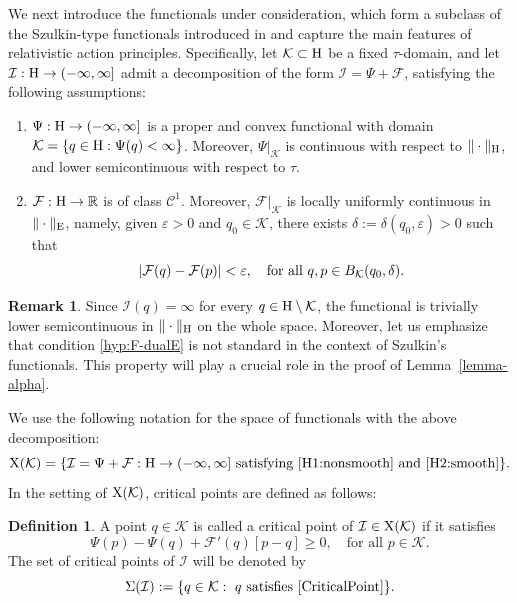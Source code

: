 \documentclass{article}
\newcommand{\boK}{\mathcal{K}}
\newcommand{\boI}{\mathcal{I}}
\newcommand{\R}{\mathbb{R}}
\newcommand{\boF}{\mathcal{F}}
\newcommand{\Hilb}{{\textnormal H}}
\newcommand{\X}{{\textnormal X}}
\theoremstyle{definition}
\newtheorem{remark}{Remark}[section]
\newtheorem{definition}{Definition}[section]
\begin{document}
          
We next introduce the functionals under consideration, which form a subclass of the Szulkin-type functionals introduced in \cite{Szu} and capture the main features of relativistic action principles. Specifically, let $\boK\subset \Hilb$ be a fixed $\tau$-domain, and let $\boI: \Hilb\to (-\infty,\infty]$ admit a decomposition of the form $\boI=\Psi+\boF$, satisfying the following assumptions:
	\begin{enumerate}[label=(H\arabic*)]   
		\item $\Psi:\Hilb\to (-\infty,\infty]$ is a proper and convex functional with domain $\boK=\{q\in\Hilb:\Psi(q)<\infty\}$. Moreover, $\Psi|_{\boK}$ is continuous with respect to $\|\cdot\|_\Hilb$, and lower semicontinuous with respect to $\tau$. \label{H1:nonsmooth}
		\item $\boF:\Hilb\to\R$ is of class $\mathcal{C}^1$. Moreover, $\boF|_\boK$ is locally uniformly continuous in ${\|\cdot\|_\textnormal E}$, namely, given $\varepsilon>0$ and $q_0\in\boK$, there exists $\delta:=\delta(q_0,\varepsilon)>0$ such that\begin{equation}\label{hyp:F-dualE}
		|\boF(q)-\boF(p)|<\varepsilon,\quad\hbox{for all }q,p\in B_\boK(q_0,\delta).\end{equation}\label{H2:smooth} 
\end{enumerate}
\begin{remark}
Since $\boI(q)=\infty$ for every $q\in\Hilb\setminus\boK$, the functional is trivially lower semicontinuous in $\|\cdot\|_\Hilb$ on the whole space. Moreover, let us emphasize that condition \eqref{hyp:F-dualE} is not standard in the context of Szulkin's functionals. This property will play a crucial role in the proof of Lemma~\ref{lemma-alpha}.
\end{remark}

We use the following notation for the space of functionals with the above decomposition:
    \begin{equation}
        \X(\boK)=\{\boI=\Psi+\boF:\Hilb\to (-\infty,\infty]\text{ satisfying  \ref{H1:nonsmooth} and \ref{H2:smooth}}\}.    \end{equation}
In the setting of $\X(\boK)$, critical points are defined as follows:
\begin{definition}\label{def:CriticalPoint}
A point $q \in \boK$ is called a critical point of $\boI \in \X(\boK)$ if it satisfies
\begin{equation}\label{CriticalPoint}
    \Psi(p) - \Psi(q) + \boF'(q)[p - q] \geq 0, \quad \text{for all } p \in \boK.
\end{equation}
The set of critical points of $\boI$ will be denoted by
\begin{equation}\label{eq:critical_point_set}
     \Sigma(\boI):=\{q\in\boK:\ q \hbox{ satisfies \eqref{CriticalPoint}}\}.
\end{equation}
\end{definition}
\end{document}
